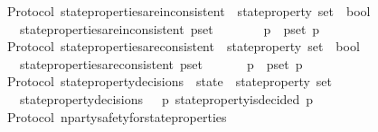 \begin{isabellebody}
\isanewline
\isanewline
{}\isamarkupfalse%
\ {\isacharparenleft}\ Protocol{\isacharparenright}\ state{\isacharunderscore}properties{\isacharunderscore}are{\isacharunderscore}inconsistent\ {\isacharcolon}{\isacharcolon}\ {\isachardoublequoteopen}state{\isacharunderscore}property\ set\ {\isasymRightarrow}\ bool{\isachardoublequoteclose}\isanewline
\ \ \isanewline
\ \ \ \ {\isachardoublequoteopen}state{\isacharunderscore}properties{\isacharunderscore}are{\isacharunderscore}inconsistent\ p{\isacharunderscore}set\ {\isacharequal}\ {\isacharparenleft}{\isasymforall}\ {\isasymsigma}\ {\isasymin}\ {\isasymSigma}{\isachardot}\ {\isasymnot}\ {\isacharparenleft}{\isasymforall}\ p\ {\isasymin}\ p{\isacharunderscore}set{\isachardot}\ p\ {\isasymsigma}{\isacharparenright}{\isacharparenright}{\isachardoublequoteclose}\isanewline
\isanewline
\isanewline
{}\isamarkupfalse%
\ {\isacharparenleft}\ Protocol{\isacharparenright}\ state{\isacharunderscore}properties{\isacharunderscore}are{\isacharunderscore}consistent\ {\isacharcolon}{\isacharcolon}\ {\isachardoublequoteopen}state{\isacharunderscore}property\ set\ {\isasymRightarrow}\ bool{\isachardoublequoteclose}\isanewline
\ \ \isanewline
\ \ \ \ {\isachardoublequoteopen}state{\isacharunderscore}properties{\isacharunderscore}are{\isacharunderscore}consistent\ p{\isacharunderscore}set\ {\isacharequal}\ {\isacharparenleft}{\isasymexists}\ {\isasymsigma}\ {\isasymin}\ {\isasymSigma}{\isachardot}\ {\isasymforall}\ p\ {\isasymin}\ p{\isacharunderscore}set{\isachardot}\ p\ {\isasymsigma}{\isacharparenright}{\isachardoublequoteclose}\isanewline
\isanewline
\isanewline
{}\isamarkupfalse%
\ {\isacharparenleft}\ Protocol{\isacharparenright}\ state{\isacharunderscore}property{\isacharunderscore}decisions\ {\isacharcolon}{\isacharcolon}\ {\isachardoublequoteopen}state\ {\isasymRightarrow}\ state{\isacharunderscore}property\ set{\isachardoublequoteclose}\isanewline
\ \ \ \isanewline
\ \ \ \ {\isachardoublequoteopen}state{\isacharunderscore}property{\isacharunderscore}decisions\ {\isasymsigma}\ {\isacharequal}\ {\isacharbraceleft}p{\isachardot}\ state{\isacharunderscore}property{\isacharunderscore}is{\isacharunderscore}decided\ {\isacharparenleft}p{\isacharcomma}\ {\isasymsigma}{\isacharparenright}{\isacharbraceright}{\isachardoublequoteclose}\isanewline
\isanewline
\isanewline
{}\isamarkupfalse%
\ {\isacharparenleft}\ Protocol{\isacharparenright}\ n{\isacharunderscore}party{\isacharunderscore}safety{\isacharunderscore}for{\isacharunderscore}state{\isacharunderscore}properties\ {\isacharcolon}\isanewline

\end{isabellebody}
